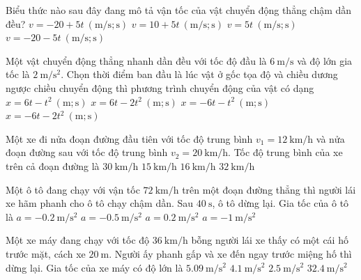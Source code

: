 \begin{ex}
	Biểu thức nào sau đây đang mô tả vận tốc của vật chuyển động thẳng chậm dần đều?
	\choice
	{\True $v=-20+5t\ \left(\si{\meter/\second}; \si{\second}\right)$}
	{$v=10+5t\ \left(\si{\meter/\second}; \si{\second}\right)$}
	{$v=5t\ \left(\si{\meter/\second}; \si{\second}\right)$}
	{$v=-20-5t\ \left(\si{\meter/\second}; \si{\second}\right)$}
	\loigiai{}
\end{ex}
\begin{ex}
	Một vật chuyển động thẳng nhanh dần đều với tốc độ đầu là $\SI{6}{\meter/\second}$ và độ lớn gia tốc là $\SI{2}{\meter/\second^2}$. Chọn thời điểm ban đầu là lúc vật ở gốc tọa độ và chiều dương ngược chiều chuyển động thì phương trình chuyển động của vật có dạng
	\choice
	{$x=6t-t^2\ \left(\si{\meter}; \si{\second}\right)$}
	{$x=6t-2t^2\ \left(\si{\meter}; \si{\second}\right)$}
	{\True $x=-6t-t^2\ \left(\si{\meter}; \si{\second}\right)$}
	{$x=-6t-2t^2\ \left(\si{\meter}; \si{\second}\right)$}
	\loigiai{}
\end{ex}
\begin{ex}
	Một xe đi nửa đoạn đường đầu tiên với tốc độ trung bình
	 $v_1=\SI{12}{\kilo\meter/\hour}$ và nửa đoạn đường	sau với tốc độ trung bình $v_2=\SI{20}{\kilo\meter/\hour}$. Tốc độ trung bình của xe trên cả đoạn đường là
	\choice
	{$\SI{30}{\kilo\meter/\hour}$}
	{\True $\SI{15}{\kilo\meter/\hour}$}
	{$\SI{16}{\kilo\meter/\hour}$}
	{$\SI{32}{\kilo\meter/\hour}$}
\end{ex}
\begin{ex}
	Một ô tô đang chạy với vận tốc $\SI{72}{\kilo\meter/\hour}$ trên một đoạn đường thẳng thì người lái xe hãm phanh cho ô tô chạy chậm dần. Sau $\SI{40}{\second}$, ô tô dừng lại. Gia tốc của ô tô là
	\choice
	{$a=\SI{-0.2}{\meter/\second^2}$}
	{\True $a=\SI{-0.5}{\meter/\second^2}$}
	{$a=\SI{0.2}{\meter/\second^2}$}
	{$a=\SI{-1}{\meter/\second^2}$}
\end{ex}

\begin{ex}
	Một xe máy đang chạy với tốc độ $\SI{36}{\kilo\meter/\hour}$ bỗng người lái xe thấy có một cái hố trước mặt, cách xe $\SI{20}{\meter}$. Người ấy phanh gấp và xe đến ngay trước miệng hố thì dừng lại. Gia tốc của xe máy có độ lớn là 
	\choice
	{$\SI{5.09}{\meter/\second^2}$}
	{$\SI{4.1}{\meter/\second^2}$}
	{\True $\SI{2.5}{\meter/\second^2}$}
	{$\SI{32.4}{\meter/\second^2}$}
	\loigiai{}
\end{ex}

